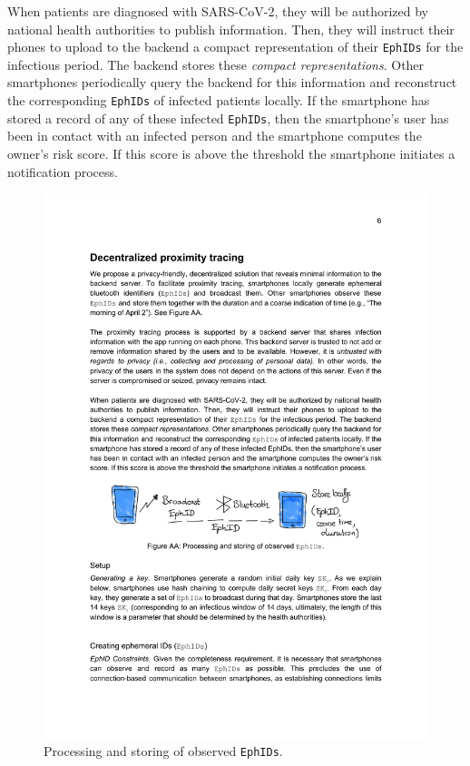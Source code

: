 \documentclass[12pt,a4paper]{article}
\begin{document}
When patients are diagnosed with SARS-CoV-2, they will be authorized by national health
authorities to publish information. Then, they will instruct their phones to upload to the
backend a compact representation of their \texttt{EphIDs} for the infectious period. The backend stores these \textit{compact representations}. Other smartphones periodically query the backend for this information and reconstruct the corresponding \texttt{EphIDs} of infected patients locally. If the smartphone has stored a record of any of these infected \texttt{EphIDs}, then the smartphone’s user has been in contact with an infected person and the smartphone computes the owner’s risk score. If this score is above the threshold the smartphone initiates a notification process.
\begin{figure}[H]
\centering
\includegraphics[scale=0.6]{fig/AA}
\caption{Processing and storing of observed \texttt{EphIDs}.}
\label{AA}
\end{figure}
\end{document}
